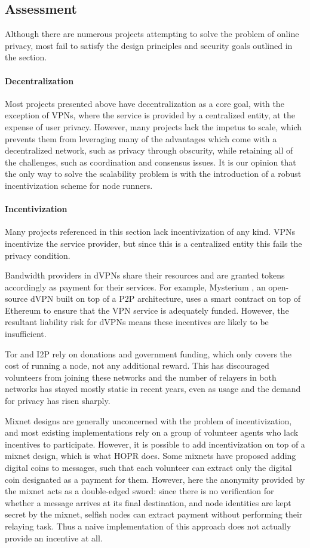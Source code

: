\subsection{Assessment}

Although there are numerous projects attempting to solve the problem of online privacy, most fail to satisfy the design principles and security goals outlined in the  section.

\paragraph{Decentralization} Most projects presented above have decentralization as a core goal, with the exception of VPNs, where the service is provided by a centralized entity, at the expense of user privacy. However, many projects lack the impetus to scale, which prevents them from leveraging many of the advantages which come with a decentralized network, such as privacy through obscurity, while retaining all of the challenges, such as coordination and consensus issues. It is our opinion that the only way to solve the scalability problem is with the introduction of a robust incentivization scheme for node runners.

\paragraph{Incentivization} Many projects referenced in this section lack incentivization of any kind. VPNs incentivize the service provider, but since this is a centralized entity this fails the privacy condition.

Bandwidth providers in dVPNs share their resources and are granted tokens accordingly as payment for their services. For example, Mysterium \cite{mysterium}, an open-source dVPN built on top of a P2P architecture, uses a smart contract on top of Ethereum to ensure that the VPN service is adequately funded. However, the resultant liability risk for dVPNs means these incentives are likely to be insufficient.

Tor and I2P rely on donations and government funding, which only covers the cost of running a node, not any additional reward. This has discouraged volunteers from joining these networks and the number of relayers in both networks has stayed mostly static in recent years, even as usage and the demand for privacy has risen sharply.

Mixnet designs are generally unconcerned with the problem of incentivization, and most existing implementations rely on a group of volunteer agents who lack incentives to participate. However, it is possible to add incentivization on top of a mixnet design, which is what HOPR does. Some mixnets have proposed adding digital coins to messages, such that each volunteer can extract only the digital coin designated as a payment for them. However, here the anonymity provided by the mixnet acts as a double-edged sword: since there is no verification for whether a message arrives at its final destination, and node identities are kept secret by the mixnet, selfish nodes can extract payment without performing their relaying task. Thus a naive implementation of this approach does not actually provide an incentive at all.

